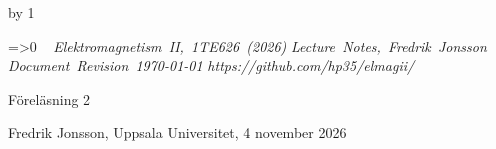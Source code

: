 {\cleardoublepage
%
%
%
%
%
%
%
\def\coursename{Elektromagnetism II}
\def\coursecode{1TE626}
\def\courseyear{2026}
\def\courserepo{https://github.com/hp35/elmagii/}
\def\lecturenumber{2}
\def\lecturetitle{Elektrisk potential och till{\"a}mpningar av Gauss lag}
\def\lecturesubtitle{}
\def\lectureauthor{Fredrik Jonsson}
\def\lectureplace{Uppsala Universitet}
\def\lecturedate{4 november 2026}
\edef\expandedlecturenumber{2}
\def\ifempty#1{\ifx\relax#1\relax}
\advance\chapno by 1
\immediate{}
\hsize=150mm\hoffset=4.6mm\vsize=230mm\voffset=7mm
\topskip=0pt\baselineskip=12pt\parskip=0pt\leftskip=0pt\parindent=15pt
\ifcolors
  \voffset=-10.2mm\topskip=0pt
\fi
\headline={\ifnum\secno>0\ifodd\pageno\rightheadline\else\leftheadline\fi
  \else\hfill\fi}
\def\rightheadline{\tenrm{\it F\"orel\"asning 2}
  \hfil{\it \coursename, \coursecode\ (\courseyear)}}
\def\leftheadline{\tenrm{\it \coursename, \coursecode\ (\courseyear)}
  \hfil{\it F\"orel\"asning 2}}
\noindent~\vskip-60pt\hskip-40pt{}
\vskip-42pt\hfill\vbox{
    \hbox{{\it \coursename, \coursecode\ (\courseyear)}}
    \hbox{{\it Lecture Notes, \lectureauthor}}
    \hbox{{\it Document Revision \today}}
    \hbox{{\it \courserepo}}}\vskip 36pt
\centerline{\twelvesc F\"orel\"asning 2}
\vskip 24pt\noindent
\centerline{}
\expandafter\ifempty\expandafter{\lecturesubtitle}%
  \else\centerline{\twelvesc\lecturesubtitle}\fi
\bigskip
\centerline{\lectureauthor, \lectureplace, \lecturedate}
\vskip24pt



}
